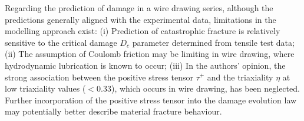 \documentclass[sn-mathphys,Numbered]{sn-jnl}%
\begin{document}
Regarding the prediction of damage in a wire drawing series, although the predictions generally aligned with the experimental data, limitations in the modelling approach exist: (i) Prediction of catastrophic fracture is relatively sensitive to the critical damage $D_c$ parameter determined from tensile test data; (ii) The assumption of Coulomb friction may be limiting in wire drawing, where hydrodynamic lubrication is known to occur; (iii) In the authors' opinion, the strong association between the positive stress tensor $\tau^+$ and the triaxiality $\eta$ at low triaxiality values ($<0.33$), which occurs in wire drawing, has been neglected.
Further incorporation of the positive stress tensor into the damage evolution law may potentially better describe material fracture behaviour.


\end{document}
